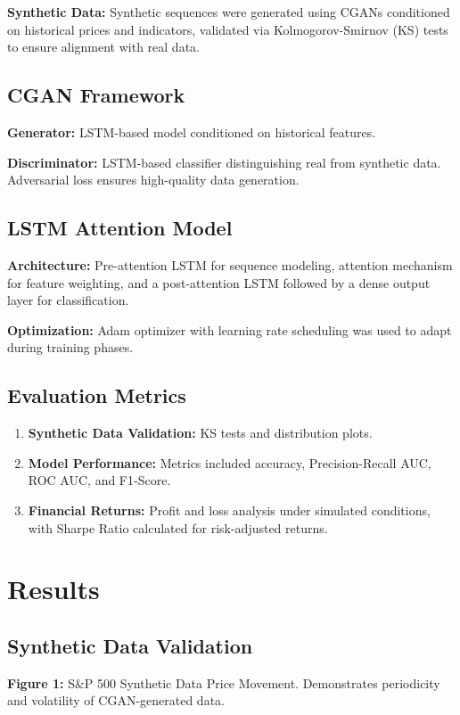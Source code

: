 \documentclass[conference]{IEEEtran}
\begin{document}
\textbf{Synthetic Data:} Synthetic sequences were generated using CGANs conditioned on historical prices and indicators, validated via Kolmogorov-Smirnov (KS) tests to ensure alignment with real data.

\subsection{CGAN Framework}
\textbf{Generator:} LSTM-based model conditioned on historical features.

\textbf{Discriminator:} LSTM-based classifier distinguishing real from synthetic data. Adversarial loss ensures high-quality data generation.

\subsection{LSTM Attention Model}
\textbf{Architecture:} Pre-attention LSTM for sequence modeling, attention mechanism for feature weighting, and a post-attention LSTM followed by a dense output layer for classification.

\textbf{Optimization:} Adam optimizer with learning rate scheduling was used to adapt during training phases.

\subsection{Evaluation Metrics}
\begin{enumerate}
    \item \textbf{Synthetic Data Validation:} KS tests and distribution plots.
    \item \textbf{Model Performance:} Metrics included accuracy, Precision-Recall AUC, ROC AUC, and F1-Score.
    \item \textbf{Financial Returns:} Profit and loss analysis under simulated conditions, with Sharpe Ratio calculated for risk-adjusted returns.
\end{enumerate}

\section{Results}
\subsection{Synthetic Data Validation}
\textbf{Figure 1:} S&P 500 Synthetic Data Price Movement. Demonstrates periodicity and volatility of CGAN-generated data.
\end{document}
